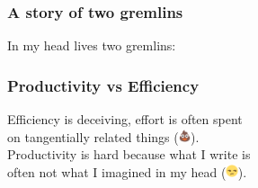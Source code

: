 \documentclass[aspectratio=1610]{beamer}
\begin{document}
	\begin{frame}[t]
		\frametitle{A story of two gremlins}
		In my head lives two gremlins:
		\vfill
		\begin{minipage}[t][0.5\textheight][t]{0.49\textwidth}
			\centering
		\end{minipage}
		\hfill
		\begin{minipage}[t][0.5\textheight][t]{0.49\textwidth}
			\centering
		\end{minipage}
		\vfill
		\centering
	\end{frame}
	\begin{frame}[t]
		\frametitle{Productivity vs Efficiency}
		\vfill
		Efficiency is deceiving, effort is often spent\\ on tangentially related things (\includegraphics[height=10pt]{images/poop_emoji.png}).\\
		\vfill
		Productivity is hard because what I write is\\ often not what I imagined in my head (\includegraphics[height=10pt]{images/unamused_emoji.png}).
		\vfill
	\end{frame}
\end{document}
